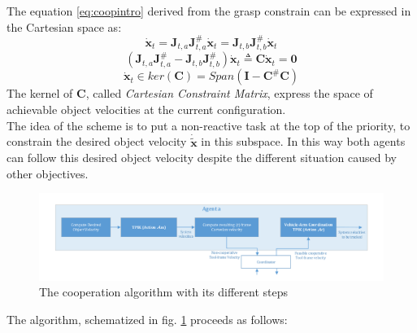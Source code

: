 The equation \eqref{eq:coopintro} derived from the grasp constrain can be expressed in the Cartesian space as:
\begin{equation}
	\boldsymbol{\dot{x}}_t = \boldsymbol{J}_{t,a} \boldsymbol{J}^\#_{t,a} \boldsymbol{\dot{x}}_t =  \boldsymbol{J}_{t,b} \boldsymbol{J}^\#_{t,b} 
	\dot{\boldsymbol{x}}_t 
\end{equation}
\begin{equation}
\label{eq:constrainMatrixC}
	(\boldsymbol{J}_{t,a} \boldsymbol{J}^\#_{t,a} - \boldsymbol{J}_{t,b} \boldsymbol{J}^\#_{t,b}) 
	\dot{\boldsymbol{x}}_t \triangleq \boldsymbol{C} \dot{\boldsymbol{x}}_t = \boldsymbol{0}
\end{equation}
\begin{equation}
	\dot{\boldsymbol{x}}_t \in ker(\boldsymbol{C}) = Span(\boldsymbol{I} - \boldsymbol{C}^\#\boldsymbol{C})
\end{equation}
The kernel of $\boldsymbol{C}$, called \textit{Cartesian Constraint Matrix}, express the space of achievable object velocities at the current configuration.\\
The idea of the scheme is to put a non-reactive task at the top of the priority, to constrain the desired object velocity $\boldsymbol{\dot{\tilde{x}}}$ in this subspace. In this way both agents can follow this desired object velocity despite the different situation caused by other objectives.\\
\begin{figure}[H]
	\begin{center}
		\includegraphics[width=1\columnwidth]{coopScheme.png}
		\caption{The cooperation algorithm with its different steps }\label{fig:coopScheme}
	\end{center}
\end{figure}
The algorithm, schematized in fig. \ref{fig:coopScheme} proceeds as follows:
